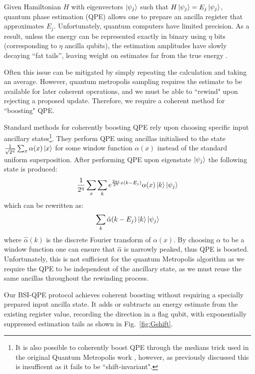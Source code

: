 \documentclass[aps,floatfix,10pt,amssymb,amsfont,amsmath,superscriptaddress,float,nofootinbib,longbibliography,nobalancelastpage,twocolumn]{revtex4-2}
\begin{document}
Given Hamiltonian $H$ with eigenvectors $\ket{\psi_j}$ such that $H\ket{\psi_j} = E_j \ket{\psi_j}$, quantum phase estimation (QPE) allows one to prepare an ancilla register that approximates $E_j$. Unfortunately, quantum computers have limited precision. As a result, unless the energy can be represented exactly in binary using $\eta$ bits (corresponding to $\eta$ ancilla qubits), the estimation amplitudes have slowly decaying ``fat tails'', leaving weight on estimates far from the true energy \cite{Nielsen_Chuang_2010}.

Often this issue can be mitigated by simply repeating the calculation and taking an average. However, quantum metropolis sampling requires the estimate to be available for later coherent operations, and we must be able to ``rewind" upon rejecting a proposed update. Therefore, we require a coherent method for ``boosting" QPE. 

Standard methods \cite{babbush2018encoding, rendon2022effects, berry2024analyzing, greenaway2024case, patel2026optimal} for coherently boosting QPE rely upon choosing specific input ancillary states\footnote{It is also possible to coherently boost QPE through the medians trick \cite{nagaj2009fast} used in the original Quantum Metropolis work \cite{Temme_2011}, however, as previously discussed this is insufficent as it fails to be ``shift-invariant".}. They perform QPE using ancillas initialised to the state $\frac{1}{\sqrt{2^{\eta}}}\sum_x \alpha(x) \ket{x}$ for some window function $\alpha(x)$ instead of the standard uniform superposition. After performing QPE upon eigenstate $\ket{\psi_j}$ the following state is produced:
\begin{equation}
   \frac{1}{2^{\eta}} \sum_x \sum_k e^{\frac{2 \pi i}{2^{\eta}}x(k-E_j)} \alpha(x)\ket{k}\ket{\psi_j}
\end{equation}
which can be rewritten as:
\begin{equation}
    \sum_k \hat\alpha(k-E_j) \ket{k}\ket{\psi_j}
\end{equation}
where $\hat \alpha(k)$ is the discrete Fourier transform of $\alpha(x)$. By choosing $\alpha$ to be a window function one can ensure that $\hat \alpha$ is narrowly peaked, thus QPE is boosted. Unfortunately, this is not sufficient for the quantum Metropolis algorithm as we require the QPE to be independent of the ancillary state, as we must reuse the same ancillas throughout the rewinding process. 

Our BSI-QPE protocol achieves coherent boosting without requiring a specially prepared input ancilla state. It adds or subtracts an energy estimate from the existing register value, recording the direction in a flag qubit, with exponentially suppressed estimation tails as shown in Fig.~\ref{fig:Gshift}.
\end{document}
